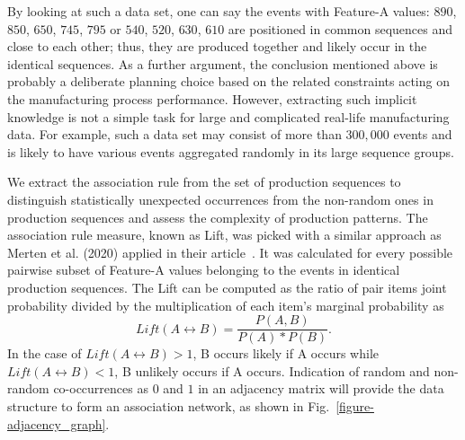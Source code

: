 By looking at such a data set, one can say the events with Feature-A values: $890$, $850$, $650$, $745$, $795$ or $540$, $520$, $630$, $610$ are positioned in common sequences and close to each other; thus, they are produced together and likely occur in the identical sequences. As a further argument, the conclusion mentioned above is probably a deliberate planning choice based on the related constraints acting on the manufacturing process performance. However, extracting such implicit knowledge is not a simple task for large and complicated real-life manufacturing data. For example, such a data set may consist of more than $300,000$ events and is likely to have various events aggregated randomly in its large sequence groups.

We extract the association rule from the set of production sequences to distinguish statistically unexpected occurrences from the non-random ones in production sequences and assess the complexity of production patterns. The association rule measure, known as Lift, was picked with a similar approach as Merten et al. (2020) applied in their article~\cite{MERTEN2020}. It was calculated for every possible pairwise subset of Feature-A values belonging to the events in identical production sequences. The Lift can be computed as the ratio of pair items joint probability divided by the multiplication of each item's marginal probability as
\begin{equation} %
	Lift(A\leftrightarrow B)=\frac{P(A,B)}{P(A)*P(B)}.
	\label{lift}
\end{equation}
In the case of $Lift(A\leftrightarrow B)> 1$, B occurs likely if A occurs while $Lift(A\leftrightarrow B)< 1$, B unlikely occurs if A occurs. Indication of random and non-random co-occurrences as $0$ and $1$ in an adjacency matrix will provide the data structure to form an association network, as shown in Fig.~\ref{figure-adjacency_graph}.

